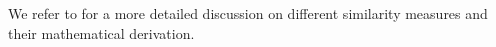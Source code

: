 		We refer to \cite{warrensUnderstandingAdjustedRand2022} for a more detailed discussion on different similarity measures and their mathematical derivation.
		

